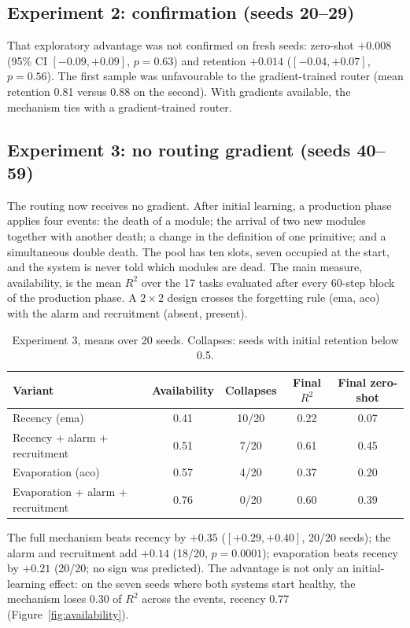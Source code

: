 \documentclass[11pt,a4paper]{article}
\begin{document}
\subsection{Experiment 2: confirmation (seeds 20--29)}

That exploratory advantage was not confirmed on fresh seeds: zero-shot $+0.008$ (95\% CI $[-0.09, +0.09]$, $p = 0.63$) and retention $+0.014$ ($[-0.04, +0.07]$, $p = 0.56$). The first sample was unfavourable to the gradient-trained router (mean retention 0.81 versus 0.88 on the second). With gradients available, the mechanism ties with a gradient-trained router.

\subsection{Experiment 3: no routing gradient (seeds 40--59)}

The routing now receives no gradient. After initial learning, a production phase applies four events: the death of a module; the arrival of two new modules together with another death; a change in the definition of one primitive; and a simultaneous double death. The pool has ten slots, seven occupied at the start, and the system is never told which modules are dead. The main measure, availability, is the mean $R^2$ over the 17 tasks evaluated after every 60-step block of the production phase. A $2\times2$ design crosses the forgetting rule (ema, aco) with the alarm and recruitment (absent, present).

\begin{table}[h]
\centering\small\setlength{\tabcolsep}{5pt}
\begin{tabular}{lcccc}
\toprule
Variant & Availability & Collapses & Final $R^2$ & Final zero-shot \\
\midrule
Recency (ema) & 0.41 & 10/20 & 0.22 & 0.07 \\
Recency + alarm + recruitment & 0.51 & 7/20 & 0.61 & 0.45 \\
Evaporation (aco) & 0.57 & 4/20 & 0.37 & 0.20 \\
Evaporation + alarm + recruitment & 0.76 & 0/20 & 0.60 & 0.39 \\
\bottomrule
\end{tabular}
\caption{Experiment 3, means over 20 seeds. Collapses: seeds with initial retention below 0.5.}
\label{tab:exp3}
\end{table}

The full mechanism beats recency by $+0.35$ ($[+0.29, +0.40]$, 20/20 seeds); the alarm and recruitment add $+0.14$ (18/20, $p = 0.0001$); evaporation beats recency by $+0.21$ (20/20; no sign was predicted). The advantage is not only an initial-learning effect: on the seven seeds where both systems start healthy, the mechanism loses 0.30 of $R^2$ across the events, recency 0.77 (Figure~\ref{fig:availability}).
\end{document}
